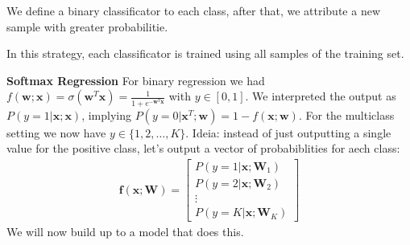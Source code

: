 \documentclass[a4paper, 11pt]{article}
\begin{document}
We define a binary classificator to each class, after that, we attribute a new sample with greater probabilitie.

In this strategy, each classificator is trained using all samples of the training set.


{\Large\textbf{Softmax Regression}}
For binary regression we had $f(\mathbf{w};\mathbf{x}) = \sigma(\mathbf{w}^{T}\mathbf{x}) = \frac{1}{1 + e^{-\mathbf{w}^{T}\mathbf{x}}}$ with $y\in[0, 1]$. We interpreted
the output as $P(y = 1|\mathbf{x};\mathbf{x})$, implying $P(y = 0|\mathbf{x}^{T};\mathbf{w}) = 1 - f(\mathbf{x};\mathbf{w})$.
For the multiclass setting we now have $y\in\{1, 2, \dots, K\}$. Ideia: instead of just outputting a single value for the positive class, let's output a vector
of probabiblities for aech class:
\begin{align*}
        \mathbf{f}(\mathbf{x};\mathbf{W}) = \left[
                \begin{array}{c}
                        P(y = 1|\mathbf{x};\mathbf{W}_1)\\
                        P(y = 2|\mathbf{x};\mathbf{W}_2)\\
                        \vdots\\
                        P(y = K|\mathbf{x};\mathbf{W}_K)
                \end{array}
                \right]
\end{align*}
We will now build up to a model that does this. 
\end{document}
